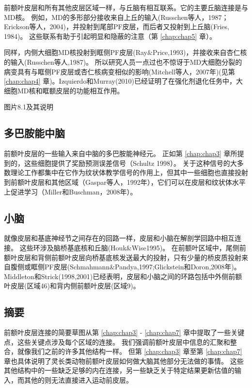前额叶皮层和所有其他皮层区域一样，与丘脑有相互联系。它的主要丘脑连接是与MD核。
例如，MD的多形部分接收来自上丘的输入(Russchen等人，1987；Erickson等人，2004)，并投射到尾部PF皮层，而后者又投射到上丘脑(Fries, 1984)。
这些联系有助于引起明显和隐蔽的注意（第 \ref{chap:chap5} 章）。
\par


同样，内侧大细胞MD核投射到眶侧PF皮层(Ray$\&$Price,1993)，并接收来自杏仁核的输入(Russchen等人,1987)。
所以研究人员一点过也不惊讶于MD大细胞分裂的病变具有与眶侧PF皮层或杏仁核病变相似的影响(Mitchell等人，2007年)(见第 \ref{chap:chap4} 章)。Izquierdo和Murray(2010)已经证明了在强化剂退化任务中，大细胞MD核和眶额皮层的功能相互作用。


图片8.1及其说明



\subsection{多巴胺能中脑}
\par

前额叶皮层的一些输入来自中脑的多巴胺能神经元。
正如第 \ref{chap:chap3} 章所提到的，这些细胞提供了奖励预测误差信号（Schultz 1998）。
关于这种信号的大多数理论工作都集中在它作为纹状体教学信号的作用上，但其中一些细胞也直接投射到前额叶皮层和其他区域（Gaspar等人，1992年），它们可以在皮层和纹状体水平上促进学习（Miller和Buschman，2008年）。



\subsection{小脑}
\par

就像皮层和基底神经节之间存在的回路一样，皮层和小脑在解剖学回路中相互连接。
这些环涉及脑桥基底核和丘脑(Houk\&Wise1995)。
在前额叶区域中，尾侧前额叶皮层和背侧前额叶皮层向桥基底核发送最大的投射，只有少量的桥皮质投射来自腹侧或眶侧PF皮层(Schmahmann\&Pandya,1997;Glickstein和Doron,2008年)。
Middleton和Strick(1998,2001)已经表明，皮层和小脑之间的环路包括中外侧前额叶皮层(区域46)和背内侧前额叶皮层(区域9)。



\subsection{摘要}
\par

前额叶皮层连接的简要草图从第 \ref{chap:chap3} - \ref{chap:chap7} 章中提取了一些关键点，这些关键点涉及每个区域的连接。
我们强调前额叶皮层中信息的汇聚和整合，就像我们之前的许多其他结构一样。
但第 \ref{chap:chap3} 章至第 \ref{chap:chap7} 章也具体说明了灵长类动物前额叶皮层如何做大脑其他部分无法做的事情。
这些其他结构中的一些缺乏足够的内在连接，另一些缺乏关于特定结果更新估值的输入，而其他的则无法直接进入运动前皮层。
\par


